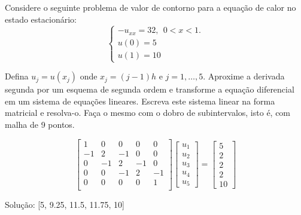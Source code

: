 \begin{exer}
 Considere o seguinte problema de valor de contorno para a equação de calor no estado estacionário:
$$\left\{\begin{array}{l}-u_{xx}=32,~~ 0<x<1.\\
u(0)=5\\
u(1)=10\end{array}
\right.
$$

Defina $u_j=u(x_j)$ onde $x_j={(j-1)}{h}$ e $j=1,\ldots,5$. Aproxime a derivada segunda por um esquema de segunda ordem e transforme a equação diferencial em um sistema de equações lineares. Escreva este sistema linear na forma matricial e resolva-o. Faça o mesmo com o dobro de subintervalos, isto é, com malha de 9 pontos. 
\end{exer}
\begin{resp}
 $$\left[
  \begin{array}{ccccc}
         1 & 0& 0& 0& 0\\
         -1 & 2 & -1 &0&0\\
         0&-1 & 2 & -1 &0\\
         0&0&-1 & 2 & -1 \\
         0 & 0& 0& 0& 1\\
        \end{array}
\right]
\left[
  \begin{array}{c}
     u_1\\ u_2\\u_3\\u_4 \\ u_5
   \end{array}
\right]
=
\left[
  \begin{array}{c}
     5\\ 2\\2\\2 \\ 10
   \end{array}
\right]
$$


Solução:  [5, 9.25, 11.5, 11.75, 10]    


\end{resp}
